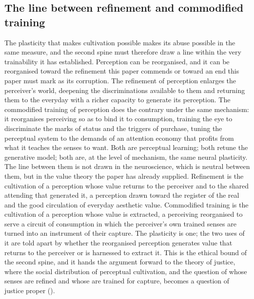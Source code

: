 \subsection{The line between refinement and commodified training}
\label{p23:sub:plas-redline}

The plasticity that makes cultivation possible makes its abuse possible in the same measure, and the second spine must therefore draw a line within the very trainability it has established. Perception can be reorganised, and it can be reorganised toward the refinement this paper commends or toward an end this paper must mark as its corruption. The refinement of perception enlarges the perceiver's world, deepening the discriminations available to them and returning them to the everyday with a richer capacity to generate its perception. The commodified training of perception does the contrary under the same mechanism: it reorganises perceiving so as to bind it to consumption, training the eye to discriminate the marks of status and the triggers of purchase, tuning the perceptual system to the demands of an attention economy that profits from what it teaches the senses to want. Both are perceptual learning; both retune the generative model; both are, at the level of mechanism, the same neural plasticity. The line between them is not drawn in the neuroscience, which is neutral between them, but in the value theory the paper has already supplied. Refinement is the cultivation of a perception whose value returns to the perceiver and to the shared attending that generated it, a perception drawn toward the register of the real and the good circulation of everyday aesthetic value. Commodified training is the cultivation of a perception whose value is extracted, a perceiving reorganised to serve a circuit of consumption in which the perceiver's own trained senses are turned into an instrument of their capture. The plasticity is one; the two uses of it are told apart by whether the reorganised perception generates value that returns to the perceiver or is harnessed to extract it. This is the ethical bound of the second spine, and it hands the argument forward to the theory of justice, where the social distribution of perceptual cultivation, and the question of whose senses are refined and whose are trained for capture, becomes a question of justice proper ().
